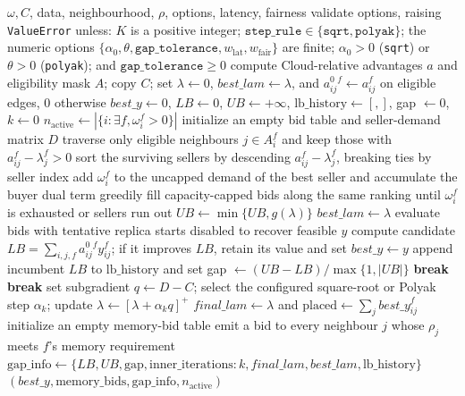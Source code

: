 \begin{algorithm}[H]
\caption{One \textsc{FaaS-MALD} dual coordination round}
\label{alg:mald}
\begin{algorithmic}[1]
\Require $\omega,C$, data, neighbourhood, $\rho$, options, latency, fairness
\State validate options, raising \texttt{ValueError} unless: $K$ is a positive
  integer; $\texttt{step\_rule}\in\{\texttt{sqrt},\texttt{polyak}\}$; the numeric
  options $\{\alpha_0,\theta,\texttt{gap\_tolerance},w_{\mathrm{lat}},w_{\mathrm{fair}}\}$
  are finite; $\alpha_0>0$ (\texttt{sqrt}) or $\theta>0$ (\texttt{polyak});
  and $\texttt{gap\_tolerance}\ge 0$
\State compute Cloud-relative advantages $a$ and eligibility mask $A$; copy $C$; set
  $\lambda\gets0$, $\textit{best\_lam}\gets\lambda$, and $a^{0}_{ij}{}^f\gets a_{ij}^f$ on eligible edges, $0$ otherwise
\State $\textit{best\_y}\gets0$, $LB\gets0$, $UB\gets+\infty$,
  $\mathrm{lb\_history}\gets[,]$, gap $\gets0$, $k\gets0$
\State $n_{\mathrm{active}}\gets|\{i:\exists f,\omega_i^f>0\}|$
  \State initialize an empty bid table and seller-demand matrix $D$
    \State traverse only eligible neighbours $j\in A_i^f$ and keep those with $a_{ij}^f-\lambda_j^f>0$
    \State sort the surviving sellers by descending $a_{ij}^f-\lambda_j^f$, breaking ties by seller index
    \State add $\omega_i^f$ to the uncapped demand of the best seller and accumulate the buyer dual term
    \State greedily fill capacity-capped bids along the same ranking until $\omega_i^f$ is exhausted or sellers run out
  \EndFor
  \State $UB\gets\min\{UB,g(\lambda)\}$
    \State $\textit{best\_lam}\gets\lambda$
  \EndIf
    \State evaluate bids with tentative replica starts disabled to recover feasible $y$
    \State compute candidate $LB=\sum_{i,j,f}a^{0}_{ij}{}^fy_{ij}^f$;
      if it improves $LB$, retain its value and set $\textit{best\_y}\gets y$
  \EndIf
  \State append incumbent $LB$ to $\mathrm{lb\_history}$ and set
    gap $\gets(UB-LB)/\max\{1,|UB|\}$
   \State \textbf{break} \EndIf
   \State \textbf{break} \EndIf
  \State set subgradient $q\gets D-C$; select the configured square-root or
    Polyak step $\alpha_k$; update $\lambda\gets[\lambda+\alpha_kq]^+$
\EndFor
\State $\textit{final\_lam}\gets\lambda$ and $\mathrm{placed}\gets\sum_j \textit{best\_y}_{ij}^f$
\State initialize an empty memory-bid table
    \State emit a bid to every neighbour $j$ whose $\rho_j$ meets $f$'s memory requirement
  \EndIf
\EndFor
\State $\mathrm{gap\_info}\gets\{LB,UB,\mathrm{gap},
  \mathrm{inner\_iterations}:k,\textit{final\_lam},\textit{best\_lam},\mathrm{lb\_history}\}$
\State \Return $(\textit{best\_y},\mathrm{memory\_bids},\mathrm{gap\_info},n_{\mathrm{active}})$
\end{algorithmic}
\end{algorithm}

